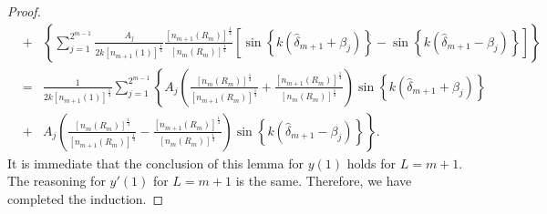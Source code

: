\documentclass[11pt,reqno]{amsart}
\theoremstyle{definition}
\theoremstyle{remark}
\numberwithin{equation}{section}
\begin{document}
\begin{proof}
\begin{eqnarray*}
		&+&\left\{\sum_{j=1}^{2^{m-1}}\frac{A_j}{2k\left[n_{m+1}(1)\right]^{\frac{1}{4}}}\frac{\left[n_{m+1}\left(R_m\right)\right]^{\frac{1}{4}}}{\left[n_{m}\left(R_m\right)\right]^\frac{1}{4}}\left[\sin\left\{k\left(\hat{\delta}_{m+1}+\beta_j\right)\right\}-\sin\left\{k\left(\hat{\delta}_{m+1}-\beta_j\right)\right\}\right]\right\}\\
		&=&\frac{1}{2k\left[n_{m+1}\left(1\right)\right]^{\frac{1}{4}}}\sum_{j=1}^{2^{m-1}}\left\{A_j\left(\frac{\left[n_{m}\left(R_m\right)\right]^{\frac{1}{4}}}{\left[n_{m+1}\left(R_m\right)\right]^\frac{1}{4}}+\frac{\left[n_{m+1}\left(R_m\right)\right]^{\frac{1}{4}}}{\left[n_{m}\left(R_m\right)\right]^\frac{1}{4}}\right)\sin\left\{ k\left(\hat{\delta}_{m+1}+\beta_j\right) \right\}\right.\\
		&+&\left.A_j\left(\frac{\left[n_{m}\left(R_m\right)\right]^{\frac{1}{4}}}{\left[n_{m+1}\left(R_m\right)\right]^\frac{1}{4}}-\frac{\left[n_{m+1}\left(R_m\right)\right]^{\frac{1}{4}}}{\left[n_{m}\left(R_m\right)\right]^\frac{1}{4}}\right)\sin\left\{k\left(\hat{\delta}_{m+1}-\beta_j\right)\right\}\right\}.
\end{eqnarray*}
It is immediate that the conclusion of this lemma for $y(1)$ holds for $L=m+1$.
The reasoning for $y'(1)$ for $L=m+1$ is the same. Therefore, we have completed the induction.
\end{proof}

\end{document}

